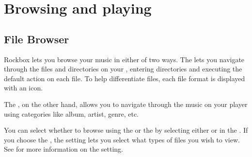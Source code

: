 \chapter{Browsing and playing}
\section{\label{ref:file_browser}File Browser}
Rockbox lets you browse your music in either of two ways. The 
 lets you navigate through the files and directories on 
your \dap, entering directories and executing the default action on each file.
To help differentiate files, each file format is displayed with an icon. 

The , on the other hand, allows you to navigate 
through the music on your player using categories like album, artist, genre,
etc.

You can select whether to browse using the  or the
 by selecting either  or
 in the .
If you choose the , the  setting
lets you select what types of files you wish to view. See
 for more information on the 
setting.



